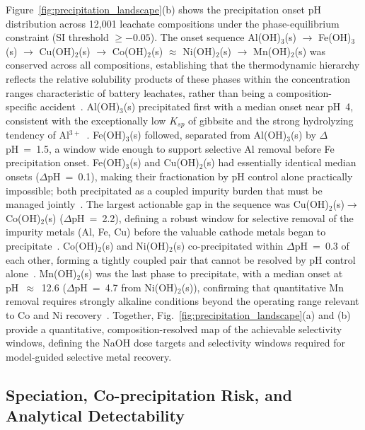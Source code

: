 \documentclass[final,2p,times]{elsarticle}
\begin{document}
Figure~\ref{fig:precipitation_landscape}(b) shows the precipitation onset pH distribution across 12{,}001 leachate compositions under the phase-equilibrium constraint (SI threshold $\geq -0.05$). The onset sequence Al(OH)$_3$(s) $\to$ Fe(OH)$_3$(s) $\to$ Cu(OH)$_2$(s) $\to$ Co(OH)$_2$(s) $\approx$ Ni(OH)$_2$(s) $\to$ Mn(OH)$_2$(s) was conserved across all compositions, establishing that the thermodynamic hierarchy reflects the relative solubility products of these phases within the concentration ranges characteristic of battery leachates, rather than being a composition-specific accident~\cite{stumm_aquatic_1996, noauthor_ksp_nodate, bard_electrochemical_2022}. Al(OH)$_3$(s) precipitated first with a median onset near pH~4, consistent with the exceptionally low $K_{sp}$ of gibbsite and the strong hydrolyzing tendency of Al$^{3+}$~\cite{may_gibbsite_1979, stumm_aquatic_1996}. Fe(OH)$_3$(s) followed, separated from Al(OH)$_3$(s) by $\Delta$pH~=~1.5, a window wide enough to support selective Al removal before Fe precipitation onset. Fe(OH)$_3$(s) and Cu(OH)$_2$(s) had essentially identical median onsets ($\Delta$pH~=~0.1), making their fractionation by pH control alone practically impossible; both precipitated as a coupled impurity burden that must be managed jointly~\cite{virolainen_removal_2017, zanoletti_review_2024}. The largest actionable gap in the sequence was Cu(OH)$_2$(s)$\to$Co(OH)$_2$(s) ($\Delta$pH~=~2.2), defining a robust window for selective removal of the impurity metals (Al, Fe, Cu) before the valuable cathode metals began to precipitate~\cite{zanoletti_review_2024, larouche_progress_2020}. Co(OH)$_2$(s) and Ni(OH)$_2$(s) co-precipitated within $\Delta$pH~=~0.3 of each other, forming a tightly coupled pair that cannot be resolved by pH control alone~\cite{swain_separation_2015, swain_separation_2016, rabah_recovery_2008}. Mn(OH)$_2$(s) was the last phase to precipitate, with a median onset at pH~$\approx$~12.6 ($\Delta$pH~=~4.7 from Ni(OH)$_2$(s)), confirming that quantitative Mn removal requires strongly alkaline conditions beyond the operating range relevant to Co and Ni recovery~\cite{noauthor_ksp_nodate, bard_electrochemical_2022, free_hydrometallurgy_2021}. Together, Fig.~\ref{fig:precipitation_landscape}(a) and (b) provide a quantitative, composition-resolved map of the achievable selectivity windows, defining the NaOH dose targets and selectivity windows required for model-guided selective metal recovery.


\subsection{Speciation, Co-precipitation Risk, and Analytical Detectability}\label{sec:speciation_coprec}
\end{document}
